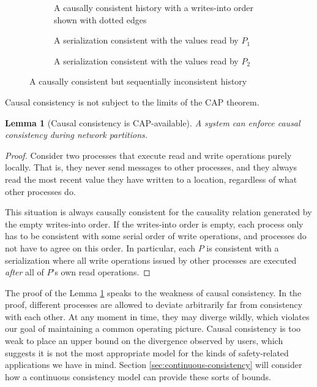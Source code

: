\documentclass[]             %
{NASA}                       %
\newtheorem{lemma}[theorem]{Lemma}
\theoremstyle{definition}
\begin{document}
\begin{figure}
  \setlength\belowcaptionskip{5ex}
  \begin{subfigure}{1\textwidth}
    \centering
    
    \caption{A causally consistent history with a writes-into order
      shown with dotted edges}
    \label{fig:dsm-causal-ex1}
  \end{subfigure}
  \begin{subfigure}{1\textwidth}
    \centering
    
    \caption{A serialization consistent with the values read by $P_1$}
    \label{fig:dsm-causal-ex1-serial1}
  \end{subfigure}
  \begin{subfigure}{1\textwidth}
    \centering
    
    \caption{A serialization consistent with the values read by $P_2$}
    \label{fig:dsm-causal-ex1-serial2}
  \end{subfigure}
  \caption{A causally consistent but sequentially inconsistent history}
\end{figure}

Causal consistency is not subject to the limits of the CAP theorem.

\begin{lemma}[Causal consistency is CAP-available]
  \label{thm:cap-causal}
  A system can enforce causal consistency during network partitions.
\end{lemma}
\begin{proof}
  Consider two processes that execute read and write operations purely
  locally. That is, they never send messages to other processes, and
  they always read the most recent value they have written to a
  location, regardless of what other processes do.

  This situation is always causally consistent for the causality
  relation generated by the empty writes-into order. If the
  writes-into order is empty, each process only has to be consistent
  with some serial order of write operations, and processes do not
  have to agree on this order. In particular, each $P$ is
  consistent with a serialization where all write operations issued by
  other processes are executed \emph{after} all of $P$'s own read
  operations.
\end{proof}

The proof of the Lemma \ref{thm:cap-causal} speaks to the weakness of
causal consistency. In the proof, different processes are allowed to
deviate arbitrarily far from consistency with each other. At any
moment in time, they may diverge wildly, which violates our goal of
maintaining a common operating picture. Causal consistency is too weak
to place an upper bound on the divergence observed by users, which
suggests it is not the most appropriate model for the kinds of
safety-related applications we have in mind. Section
\ref{sec:continuous-consistency} will consider how a continuous
consistency model can provide these sorts of bounds.
\end{document}
